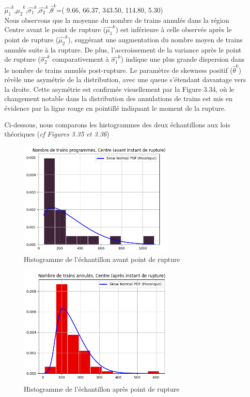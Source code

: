 {$\hat{\mu_1}^k$,$\hat{\mu_2}^k$,$\hat{\sigma_1}^k$,$\hat{\sigma_2}^k$,$\hat{\theta}^k$=(  9.66, 66.37, 343.50, 114.80, 5.30)\\

Nous observons que la moyenne du nombre de trains annulés dans la région Centre avant le point de rupture ($\hat{\mu_1}^k$) est inférieure à celle observée après le point de rupture ($\hat{\mu_2}^k$), suggérant une augmentation du nombre moyen de trains annulés suite à la rupture. De plus, l'accroissement de la variance après le point de rupture ($\hat{\sigma_2}^k$ comparativement à $\hat{\sigma_1}^k$) indique une plus grande dispersion dans le nombre de trains annulés post-rupture. Le paramètre de skewness positif ($\hat{\theta}^k$) révèle une asymétrie de la distribution, avec une queue s'étendant davantage vers la droite. Cette asymétrie est confirmée visuellement par la Figure 3.34, où le changement notable dans la distribution des annulations de trains est mis en évidence par la ligne rouge en pointillé indiquant le moment de la rupture.


Ci-dessous, nous comparons les histogrammes des deux échantillons aux lois théoriques (\textit{cf Figures 3.35 et 3.36})

\begin{figure}[H]
  \centering
  \includegraphics[width=0.7\textwidth]{image/Cn-FIG11.png}
  \caption{Histogramme de l'échantillon avant point de rupture}
\end{figure}

\begin{figure}[H]
  \centering
  \includegraphics[width=0.7\textwidth]{image/Cn-FIG12.png}
  \caption{Histogramme de l'échantillon après point de rupture}
\end{figure}

}
